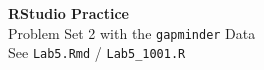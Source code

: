 \documentclass[aspectratio=169,11pt]{beamer}
\begin{document}
{
\begin{frame}
  \vfill
  \centering
  {\color{qrnavy}\Huge\bfseries RStudio Practice}\\[0.8em]
  {\color{qrblue}\large Problem Set 2 with the \texttt{gapminder} Data}\\[0.4em]
  {\color{qrgray} See \texttt{Lab5.Rmd} / \texttt{Lab5\_1001.R}}
  \vfill
\end{frame}
}
\end{document}
